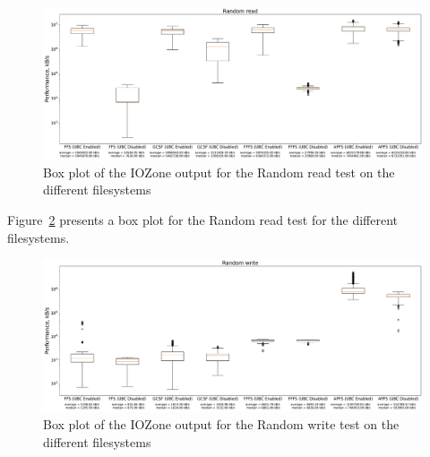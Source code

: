\begin{figure}[!ht]
	\label{fig:res_box_rndread}
	\begin{center}
		\includegraphics[width=1.0\textwidth]{figures.nosync/benchmarking/Random read-boxplot.pdf}
	\end{center}
	\caption{Box plot of the IOZone output for the Random read test on the different filesystems}
\end{figure}

\FloatBarrier

Figure~\ref{fig:res_box_rndwrite} presents a box plot for the Random read test for the different filesystems. 

\begin{figure}[!ht]
	\label{fig:res_box_rndwrite}
	\begin{center}
		\includegraphics[width=1.0\textwidth]{figures.nosync/benchmarking/Random write-boxplot.pdf}
	\end{center}
	\caption{Box plot of the IOZone output for the Random write test on the different filesystems}
\end{figure}

\FloatBarrier

